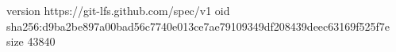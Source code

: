 version https://git-lfs.github.com/spec/v1
oid sha256:d9ba2be897a00bad56c7740e013ce7ae79109349df208439deec63169f525f7e
size 43840
